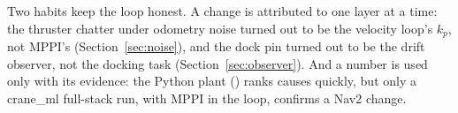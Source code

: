 \noindent Two habits keep the loop honest. A change is attributed to one layer at a time:
the thruster chatter under odometry noise turned out to be the velocity loop's $k_p$, not
MPPI's (Section~\ref{sec:noise}), and the dock pin turned out to be the drift observer, not
the docking task (Section~\ref{sec:observer}). And a number is used only with its evidence:
the Python plant () ranks causes quickly, but only a crane\_ml
full-stack run, with MPPI in the loop, confirms a Nav2 change.


